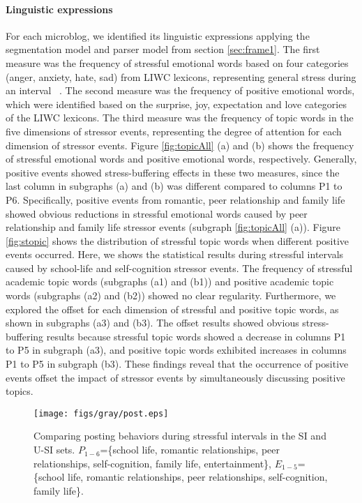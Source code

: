 \documentclass[5p,times,numbers,authoryear]{elsarticle}
\begin{document}
\paragraph{\textbf{Linguistic expressions}}
For each microblog, we identified its linguistic expressions applying the segmentation model and parser model from section \ref{sec:frame1}.
The first measure was the frequency of stressful emotional words based on four categories (anger, anxiety, hate, sad) from LIWC lexicons, representing general stress during an interval ~\citep{Tausczik2010The}.
The second measure was the frequency of positive emotional words,
which were identified based on the surprise, joy, expectation and love categories of the LIWC lexicons.
The third measure was the frequency of topic words in the five dimensions of stressor events,
representing the degree of attention for each dimension of stressor events.
Figure \ref{fig:topicAll} (a) and (b) shows the frequency of stressful emotional words and positive emotional words, respectively.
Generally, positive events showed stress-buffering effects in these two measures,
since the last column in subgraphs (a) and (b) was different compared to columns P1 to P6.
Specifically, positive events from romantic, peer relationship and family life showed obvious
reductions in stressful emotional words caused by peer relationship and family life stressor events (subgraph \ref{fig:topicAll} (a)).
Figure \ref{fig:stopic} shows the distribution of stressful topic words when different positive events occurred.
Here, we shows the statistical results during stressful intervals caused by school-life and self-cognition stressor events.
The frequency of stressful academic topic words (subgraphs (a1) and (b1))
and positive academic topic words (subgraphs (a2) and (b2)) showed no clear regularity.
Furthermore, we explored the offset for each dimension of stressful and positive topic words,
as shown in subgraphs (a3) and (b3).
The offset results showed obvious stress-buffering results 
because stressful topic words showed a decrease in columns P1 to P5 in subgraph (a3),
and positive topic words exhibited increases in columns P1 to P5 in subgraph (b3).
These findings reveal that the occurrence of positive events offset the impact of stressor events by simultaneously discussing positive topics.

\begin{figure}[h]
\centering
\texttt{[image: figs/gray/post.eps]}
\caption{\small{Comparing posting behaviors during stressful intervals in the SI and U-SI sets.
$P_{1-6}$=\{school life, romantic relationships, peer relationships, self-cognition, family life, entertainment\},
$E_{1-5}$=\{school life, romantic relationships, peer relationships, self-cognition, family life\}.}}
\label{fig:post}
\end{figure}
\end{document}
